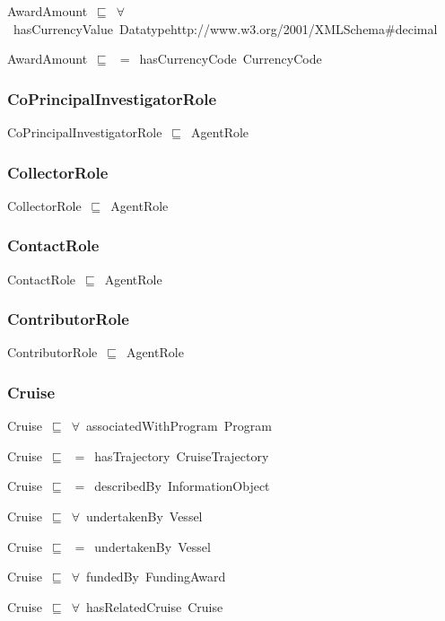 \documentclass{article}
\begin{document}
AwardAmount~\ensuremath{\sqsubseteq}~\ensuremath{\forall}~hasCurrencyValue~Datatypehttp://www.w3.org/2001/XMLSchema#decimal~

AwardAmount~\ensuremath{\sqsubseteq}~\ensuremath{=}~hasCurrencyCode~CurrencyCode~

\subsubsection*{CoPrincipalInvestigatorRole}

CoPrincipalInvestigatorRole~\ensuremath{\sqsubseteq}~AgentRole~

\subsubsection*{CollectorRole}

CollectorRole~\ensuremath{\sqsubseteq}~AgentRole~

\subsubsection*{ContactRole}

ContactRole~\ensuremath{\sqsubseteq}~AgentRole~

\subsubsection*{ContributorRole}

ContributorRole~\ensuremath{\sqsubseteq}~AgentRole~

\subsubsection*{Cruise}

Cruise~\ensuremath{\sqsubseteq}~\ensuremath{\forall}~associatedWithProgram~Program~

Cruise~\ensuremath{\sqsubseteq}~\ensuremath{=}~hasTrajectory~CruiseTrajectory~

Cruise~\ensuremath{\sqsubseteq}~\ensuremath{=}~describedBy~InformationObject~

Cruise~\ensuremath{\sqsubseteq}~\ensuremath{\forall}~undertakenBy~Vessel~

Cruise~\ensuremath{\sqsubseteq}~\ensuremath{=}~undertakenBy~Vessel~

Cruise~\ensuremath{\sqsubseteq}~\ensuremath{\forall}~fundedBy~FundingAward~

Cruise~\ensuremath{\sqsubseteq}~\ensuremath{\forall}~hasRelatedCruise~Cruise~
\end{document}
